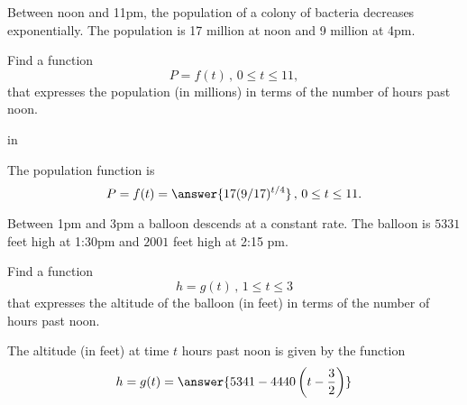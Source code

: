 \documentclass{ximera}
\newcommand{\pskip}{\vskip 0.1 in}
\begin{document}
\begin{question}  \label{Q87d6fgte}
Between noon and 11pm, the population of a colony of bacteria decreases exponentially. The population is 17 million at noon and 9 million at 4pm.

Find a function
\[
        P = f(t) \, , \, 0\leq t \leq 11 ,
\]
that expresses the population (in millions) in terms of the number of hours past noon.

\pskip

The population function is
\[
    P = f(t) = \answer{17(9/17)^{t/4}} \, , \, 0\leq t \leq 11 .
\]
\end{question}


\begin{question}  \label{Q98d33dg5r5r3}
Between 1pm and 3pm a balloon descends at a constant rate. The balloon is $5331$ feet high at 1:30pm and $2001$ feet high at 2:15 pm.

Find a function
\[
      h = g(t) \, , \, 1\leq t \leq 3
\]
that expresses the altitude of the balloon (in feet) in terms of the number of hours past noon.
\end{question}

The altitude (in feet) at time $t$ hours past noon is given by the function
\[
  h = g(t) = \answer{5341 - 4440  \left(t - \frac{3}{2}   \right)}
\]
\end{document}
